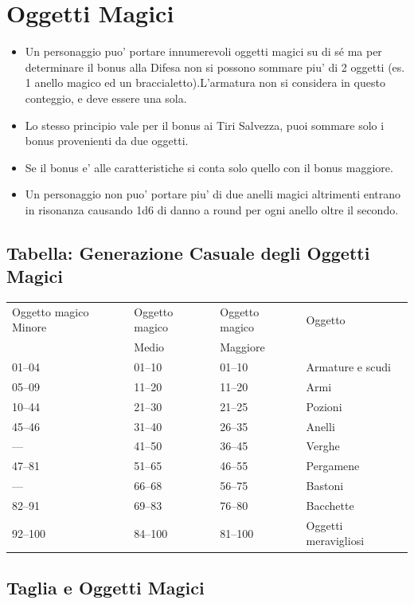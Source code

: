 \documentclass[a4paper,11pt,twoside,openany]{dndbook}
\begin{document}
{\pagebreak

\section{Oggetti Magici}

\label{oggetti-magici}
\begin{itemize}
\item 
Un personaggio puo' portare innumerevoli oggetti magici su di sé ma per determinare il bonus alla Difesa non si possono sommare piu' di 2 oggetti (es. 1 anello magico ed un braccialetto).L'armatura non si considera in questo conteggio, e deve essere una sola.
\item 
Lo stesso principio vale per il bonus ai Tiri Salvezza, puoi sommare solo i bonus provenienti da due oggetti.
\item 
Se il bonus e' alle caratteristiche si conta solo quello con il bonus maggiore.
\item 
Un personaggio non puo' portare piu' di due anelli magici altrimenti
entrano in risonanza causando 1d6 di danno a round per ogni anello oltre il secondo.
\end{itemize}



\subsection{Tabella: Generazione Casuale degli Oggetti Magici}

\label{tabella-generazione-casuale-degli-oggetti-magici}

\begin{tabular}[c]{@{}llll@{}}
\toprule 
Oggetto magico Minore & Oggetto magico& Oggetto magico & Oggetto\\
&Medio & Maggiore\\
01--04 & 01--10 & 01--10 & Armature e scudi\tabularnewline
05--09 & 11--20 & 11--20 & Armi\tabularnewline
10--44 & 21--30 & 21--25 & Pozioni\tabularnewline
45--46 & 31--40 & 26--35 & Anelli\tabularnewline
--- & 41--50 & 36--45 & Verghe\tabularnewline
47--81 & 51--65 & 46--55 & Pergamene\tabularnewline
--- & 66--68 & 56--75 & Bastoni\tabularnewline
82--91 & 69--83 & 76--80 & Bacchette\tabularnewline
92--100 & 84--100 & 81--100 & Oggetti meravigliosi\tabularnewline
\bottomrule
\end{tabular}


\subsection{Taglia e Oggetti Magici}

}
\end{document}
